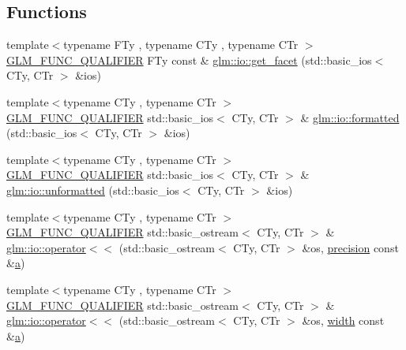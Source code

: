 \subsection*{Functions}
\begin{DoxyCompactItemize}
\item 
{\footnotesize template$<$typename F\+Ty , typename C\+Ty , typename C\+Tr $>$ }\\\mbox{\hyperlink{setup_8hpp_a33fdea6f91c5f834105f7415e2a64407}{G\+L\+M\+\_\+\+F\+U\+N\+C\+\_\+\+Q\+U\+A\+L\+I\+F\+I\+ER}} F\+Ty const  \& \mbox{\hyperlink{namespaceglm_1_1io_a9e8927cf032254b0eee4ec650286e1f9}{glm\+::io\+::get\+\_\+facet}} (std\+::basic\+\_\+ios$<$ C\+Ty, C\+Tr $>$ \&ios)
\item 
{\footnotesize template$<$typename C\+Ty , typename C\+Tr $>$ }\\\mbox{\hyperlink{setup_8hpp_a33fdea6f91c5f834105f7415e2a64407}{G\+L\+M\+\_\+\+F\+U\+N\+C\+\_\+\+Q\+U\+A\+L\+I\+F\+I\+ER}} std\+::basic\+\_\+ios$<$ C\+Ty, C\+Tr $>$ \& \mbox{\hyperlink{namespaceglm_1_1io_aa31ec433f6039e5bd35f0f58b37bef83}{glm\+::io\+::formatted}} (std\+::basic\+\_\+ios$<$ C\+Ty, C\+Tr $>$ \&ios)
\item 
{\footnotesize template$<$typename C\+Ty , typename C\+Tr $>$ }\\\mbox{\hyperlink{setup_8hpp_a33fdea6f91c5f834105f7415e2a64407}{G\+L\+M\+\_\+\+F\+U\+N\+C\+\_\+\+Q\+U\+A\+L\+I\+F\+I\+ER}} std\+::basic\+\_\+ios$<$ C\+Ty, C\+Tr $>$ \& \mbox{\hyperlink{namespaceglm_1_1io_a8f950faa7ad67cac1287beaf896a8bb6}{glm\+::io\+::unformatted}} (std\+::basic\+\_\+ios$<$ C\+Ty, C\+Tr $>$ \&ios)
\item 
{\footnotesize template$<$typename C\+Ty , typename C\+Tr $>$ }\\\mbox{\hyperlink{setup_8hpp_a33fdea6f91c5f834105f7415e2a64407}{G\+L\+M\+\_\+\+F\+U\+N\+C\+\_\+\+Q\+U\+A\+L\+I\+F\+I\+ER}} std\+::basic\+\_\+ostream$<$ C\+Ty, C\+Tr $>$ \& \mbox{\hyperlink{namespaceglm_1_1io_ac52a8c5f8ea189f5bae2e5b8e382675f}{glm\+::io\+::operator$<$$<$}} (std\+::basic\+\_\+ostream$<$ C\+Ty, C\+Tr $>$ \&os, \mbox{\hyperlink{_s_d_l__opengl__glext_8h_ae6165268264b393d031f89082216499d}{precision}} const \&\mbox{\hyperlink{_s_d_l__opengl__glext_8h_a3309789fc188587d666cda5ece79cf82}{a}})
\item 
{\footnotesize template$<$typename C\+Ty , typename C\+Tr $>$ }\\\mbox{\hyperlink{setup_8hpp_a33fdea6f91c5f834105f7415e2a64407}{G\+L\+M\+\_\+\+F\+U\+N\+C\+\_\+\+Q\+U\+A\+L\+I\+F\+I\+ER}} std\+::basic\+\_\+ostream$<$ C\+Ty, C\+Tr $>$ \& \mbox{\hyperlink{namespaceglm_1_1io_ac4783e4e3b0384619625d5d2d00c27b8}{glm\+::io\+::operator$<$$<$}} (std\+::basic\+\_\+ostream$<$ C\+Ty, C\+Tr $>$ \&os, \mbox{\hyperlink{_s_d_l__opengl_8h_a9a82cf3caff84cabc4598e2619faac17}{width}} const \&\mbox{\hyperlink{_s_d_l__opengl__glext_8h_a3309789fc188587d666cda5ece79cf82}{a}})

\end{DoxyCompactItemize}
